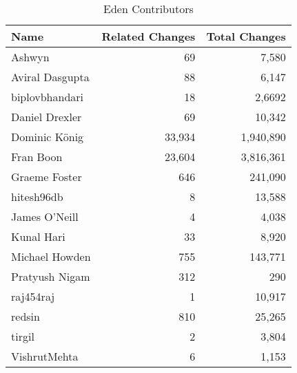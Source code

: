 \documentclass[a4paper,man,natbib,floatsintext]{apa6}
\begin{document}
\begin{table}[ht]
\caption{Eden Contributors}
\label{tab:contribs-1}
\begin{tabular}{|l|r|r|}
\hline
Name            & Related Changes & Total Changes \\ \hline
Ashwyn          & 69              & 7,580         \\ \hline
Aviral Dasgupta & 88              & 6,147         \\ \hline
biplovbhandari  & 18              & 2,6692        \\ \hline
Daniel Drexler  & 69              & 10,342        \\ \hline
Dominic König   & 33,934          & 1,940,890     \\ \hline
Fran Boon       & 23,604          & 3,816,361     \\ \hline
Graeme Foster   & 646             & 241,090       \\ \hline
hitesh96db      & 8               & 13,588        \\ \hline
James O'Neill   & 4               & 4,038         \\ \hline
Kunal Hari      & 33              & 8,920         \\ \hline
Michael Howden  & 755             & 143,771       \\ \hline
Pratyush Nigam  & 312             & 290           \\ \hline
raj454raj       & 1               & 10,917        \\ \hline
redsin          & 810             & 25,265        \\ \hline
tirgil          & 2               & 3,804         \\ \hline
VishrutMehta    & 6               & 1,153         \\ \hline
\end{tabular}
\end{table} 
\end{document}
